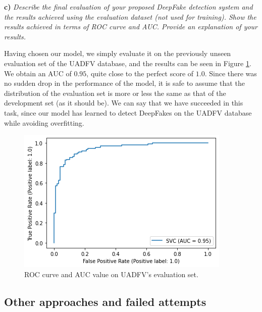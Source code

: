\documentclass[11pt]{article}
\begin{document}
\textbf{c)} \textit{Describe the final evaluation of your proposed DeepFake detection system and the results achieved using the evaluation dataset (not used for training). Show the results achieved in terms of ROC curve and AUC. Provide an explanation of your results.}

Having chosen our model, we simply evaluate it on the previously unseen evaluation set of the UADFV database, and the results can be seen in Figure \ref{fig:t1-roc-test}. We obtain an AUC of $0.95$, quite close to the perfect score of $1.0$. Since there was no sudden drop in the performance of the model, it is safe to assume that the distribution of the evaluation set is more or less the same as that of the development set (as it should be). We can say that we have succeeded in this task, since our model has learned to detect DeepFakes on the UADFV database while avoiding overfitting.

\begin{figure}[h!]
  \centering
  \includegraphics[width=.6\textwidth]{img/1-roc-UADFV}
  \caption{ROC curve and AUC value on UADFV's evaluation set.}
  \label{fig:t1-roc-test}
\end{figure}

\subsection*{Other approaches and failed attempts}
\end{document}
